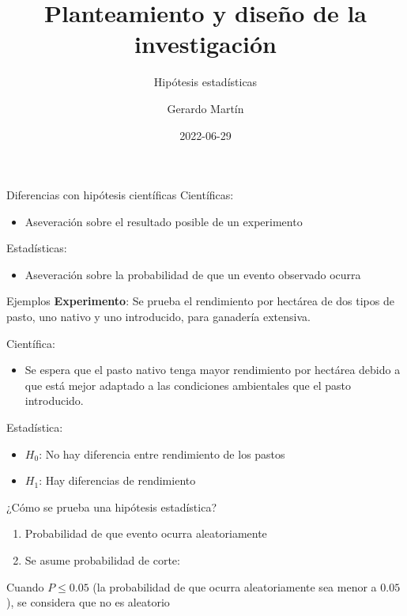 \documentclass[
  11pt,
  ignorenonframetext,
]{beamer}
\title{Planteamiento y diseño de la investigación}
\subtitle{Hipótesis estadísticas}
\author{Gerardo Martín}
\date{2022-06-29}
\providecommand{\tightlist}{%
  \setlength{\itemsep}{0pt}\setlength{\parskip}{0pt}}
\begin{document}
\frame{\titlepage}

\begin{frame}{Diferencias con hipótesis científicas}
\protect\hypertarget{diferencias-con-hipuxf3tesis-cientuxedficas}{}
Científicas:

\begin{itemize}
\tightlist
\item
  Aseveración sobre el resultado posible de un experimento
\end{itemize}

Estadísticas:

\begin{itemize}
\tightlist
\item
  Aseveración sobre la probabilidad de que un evento observado ocurra
\end{itemize}
\end{frame}

\begin{frame}{Ejemplos}
\protect\hypertarget{ejemplos}{}
\textbf{Experimento}: Se prueba el rendimiento por hectárea de dos tipos
de pasto, uno nativo y uno introducido, para ganadería extensiva.

Científica:

\begin{itemize}
\tightlist
\item
  Se espera que el pasto nativo tenga mayor rendimiento por hectárea
  debido a que está mejor adaptado a las condiciones ambientales que el
  pasto introducido.
\end{itemize}

Estadística:

\begin{itemize}
\tightlist
\item
  \(H_0\): No hay diferencia entre rendimiento de los pastos
\item
  \(H_1\): Hay diferencias de rendimiento
\end{itemize}
\end{frame}

\begin{frame}{¿Cómo se prueba una hipótesis estadística?}
\protect\hypertarget{cuxf3mo-se-prueba-una-hipuxf3tesis-estaduxedstica}{}
\begin{enumerate}
\item
  Probabilidad de que evento ocurra aleatoriamente
\item
  Se asume probabilidad de corte:
\end{enumerate}

Cuando \(P \leq 0.05\) (la probabilidad de que ocurra aleatoriamente sea
menor a \(0.05\)), se considera que no es aleatorio
\end{frame}
\end{document}
